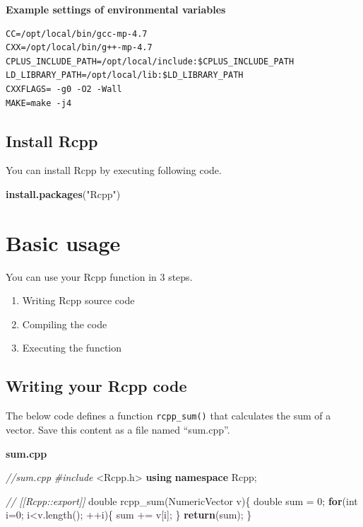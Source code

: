 \documentclass[]{book}
\newenvironment{Shaded}{\begin{snugshade}}{\end{snugshade}}
\newcommand{\CommentTok}[1]{\textcolor[rgb]{0.56,0.35,0.01}{\textit{#1}}}
\newcommand{\ControlFlowTok}[1]{\textcolor[rgb]{0.13,0.29,0.53}{\textbf{#1}}}
\newcommand{\DataTypeTok}[1]{\textcolor[rgb]{0.13,0.29,0.53}{#1}}
\newcommand{\DecValTok}[1]{\textcolor[rgb]{0.00,0.00,0.81}{#1}}
\newcommand{\ImportTok}[1]{#1}
\newcommand{\KeywordTok}[1]{\textcolor[rgb]{0.13,0.29,0.53}{\textbf{#1}}}
\newcommand{\NormalTok}[1]{#1}
\newcommand{\PreprocessorTok}[1]{\textcolor[rgb]{0.56,0.35,0.01}{\textit{#1}}}
\newcommand{\StringTok}[1]{\textcolor[rgb]{0.31,0.60,0.02}{#1}}
\providecommand{\tightlist}{%
  \setlength{\itemsep}{0pt}\setlength{\parskip}{0pt}}
\begin{document}
\textbf{Example settings of environmental variables}

\begin{verbatim}
CC=/opt/local/bin/gcc-mp-4.7
CXX=/opt/local/bin/g++-mp-4.7
CPLUS_INCLUDE_PATH=/opt/local/include:$CPLUS_INCLUDE_PATH
LD_LIBRARY_PATH=/opt/local/lib:$LD_LIBRARY_PATH
CXXFLAGS= -g0 -O2 -Wall
MAKE=make -j4
\end{verbatim}

\hypertarget{install-rcpp}{%
\section{Install Rcpp}\label{install-rcpp}}

You can install Rcpp by executing following code.

\begin{Shaded}
\begin{Highlighting}[]
\KeywordTok{install.packages}\NormalTok{(}\StringTok{"Rcpp"}\NormalTok{)}
\end{Highlighting}
\end{Shaded}

\hypertarget{basic-usage}{%
\chapter{Basic usage}\label{basic-usage}}

You can use your Rcpp function in 3 steps.

\begin{enumerate}
\def\labelenumi{\arabic{enumi}.}
\tightlist
\item
  Writing Rcpp source code
\item
  Compiling the code
\item
  Executing the function
\end{enumerate}

\hypertarget{writing-your-rcpp-code}{%
\section{Writing your Rcpp code}\label{writing-your-rcpp-code}}

The below code defines a function \texttt{rcpp\_sum()} that calculates the sum of a vector. Save this content as a file named ``sum.cpp''.

\textbf{sum.cpp}

\begin{Shaded}
\begin{Highlighting}[]
\CommentTok{//sum.cpp}
\PreprocessorTok{#include }\ImportTok{<Rcpp.h>}
\KeywordTok{using} \KeywordTok{namespace}\NormalTok{ Rcpp;}

\CommentTok{// [[Rcpp::export]]}
\DataTypeTok{double}\NormalTok{ rcpp_sum(NumericVector v)\{}
    \DataTypeTok{double}\NormalTok{ sum = }\DecValTok{0}\NormalTok{;}
    \ControlFlowTok{for}\NormalTok{(}\DataTypeTok{int}\NormalTok{ i=}\DecValTok{0}\NormalTok{; i<v.length(); ++i)\{}
\NormalTok{        sum += v[i];}
\NormalTok{    \}}
    \ControlFlowTok{return}\NormalTok{(sum);}
\NormalTok{\}}
\end{Highlighting}
\end{Shaded}
\end{document}
